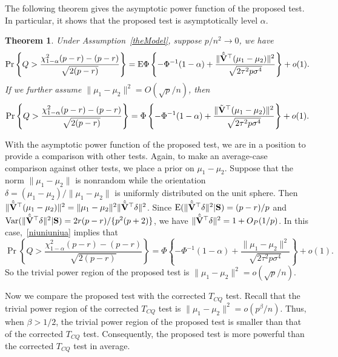 \documentclass[times,sort&compress,3p]{elsarticle}
\newcommand{\myE}{ {\rm E} }
\newcommand{\myVar}{ {\rm Var} }
\theoremstyle{plain}
\newtheorem{theorem}{\quad\quad Theorem}
\theoremstyle{definition}
\theoremstyle{remark}
\begin{document}
The following theorem gives the asymptotic power function of the proposed test.
 In particular, it shows that the proposed test is asymptotically level $\alpha$.
\begin{theorem}\label{testPowerh}
    Under Assumption~\ref{theModel},
suppose $p/n^2\to 0$, we have
        \begin{equation}\label{niuniuniua}
            \Pr\left\{ Q>\frac{\chi^2_{1-\alpha}(p-r)-(p-r)}{\sqrt{2(p-r)}}\right\}=
            \myE\Phi\left\{-\Phi^{-1}(1-\alpha)+\frac{\|\hat{\tilde{\BV}}^\top (\mu_1-\mu_2)\|^2}{\sqrt{2\tau^2 p\sigma^4}}\right\} +o(1).
        \end{equation}
     If we further assume $\|\mu_1-\mu_2\|^2=O({\sqrt{p}}/{n})$, then
    \begin{equation}\label{niuniuniub}
        \Pr\left\{ Q>\frac{\chi^2_{1-\alpha}(p-r)-(p-r)}{\sqrt{2(p-r)}}\right\}=\Phi\left\{-\Phi^{-1}(1-\alpha)+\frac{\|\tilde{\mathbf{V}}^\top (\mu_1-\mu_2)\|^2}{\sqrt{2\tau^2 p\sigma^4}}\right\}+o(1).
    \end{equation}
\end{theorem}

With the asymptotic power function of the proposed test, we are in a position to provide a comparison with other tests.
Again, to make an average-case comparison against other tests, we place a prior on $\mu_1-\mu_2$.
Suppose that the norm $\|\mu_1-\mu_2\|$ is nonrandom while the orientation $\delta=(\mu_1-\mu_2)/\|\mu_1-\mu_2\|$ is uniformly distributed on the unit sphere.
Then $\|\hat{\tilde{\mathbf{V}}}^\top (\mu_1-\mu_2)\|^2=\|\mu_1-\mu_2\|^2 \|\hat{\tilde{\mathbf{V}}}^\top \delta\|^2$.
Since $\myE (\|\hat{\tilde{\BV}}^\top \delta\|^2|\BS)=(p-r)/p$ and $\myVar (\|\hat{\tilde{\BV}}^\top \delta\|^2|\BS) = 2r(p-r)/\{p^2(p+2)\}$, we have $\|\hat{\tilde{\mathbf{V}}}^\top \delta\|^2=1+O_P(1/p)$.
In this case,~\eqref{niuniuniua} implies that
    \begin{equation*}
        \Pr\left\{Q>\frac{\chi^2_{1-\alpha}(p-r)-(p-r)}{\sqrt{2(p-r)}}\right\}=
        \Phi\left\{-\Phi^{-1}(1-\alpha)+\frac{\|\mu_1-\mu_2\|^2}{\sqrt{2\tau^2 p\sigma^4}}\right\}+o(1).
    \end{equation*}
So the trivial power region of the proposed test is $\|\mu_1-\mu_2\|^2= o(\sqrt{p}/n)$.

Now we compare the proposed test with the corrected $T_{CQ}$ test.
Recall that the trivial power region of the corrected $T_{CQ}$ test is $\|\mu_1-\mu_2\|^2=o( p^{\beta}/n)$.
 Thus, when $\beta>1/2$, the trivial power region of the proposed test is smaller than that of the corrected $T_{CQ}$ test.
Consequently, the proposed test is more powerful than the corrected $T_{CQ}$ test in average.
\end{document}
